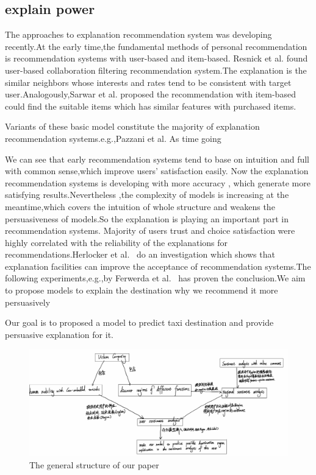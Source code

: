 \documentclass[runningheads]{llncs}
\begin{document}
\subsection{explain power}
The approaches to explanation recommendation system was developing recently.At the early time,the fundamental methods of personal recommendation is recommendation systems with user-based and item-based. Resnick et al.\cite{Resnick1994UserBased} found user-based collaboration filtering recommendation system.The explanation is the similar neighbors whose interests and rates tend to be consistent with target user.Analogously,Sarwar et al. \cite{Sarwar2001ItemBased} proposed the recommendation with item-based could find the suitable items which has similar features with purchased items.

Variants of these basic model constitute the majority of explanation recommendation systems.e.g.,Pazzani et al.\cite{Pazzani2007ContentBased}
As time going



We can see that early recommendation systems tend to base on intuition and full with common sense,which improve users' satisfaction easily. Now the explanation recommendation systems is developing with more accuracy , which generate more satisfying results.Nevertheless ,the complexity of models is increasing at the meantime,which covers the intuition of whole structure and weakens the persuasiveness of models.So the explanation is playing an important part in recommendation systems.%
Majority of users trust and choice satisfaction were highly correlated with the reliability of the explanations for recommendations.Herlocker et al.~\cite{Herlocker2000Explanation}  do an investigation which shows that explanation facilities can improve the acceptance of recommendation systems.The following experiments,e.g.,by Ferwerda et al.~\cite{Ferwerda2012ContentCorrelate} has proven the conclusion.We aim to propose models to explain the destination why we recommend it more persuasively


Our goal is to proposed a model to predict taxi destination and provide persuasive explanation for it.

\begin{figure}
    \centering
    \includegraphics[scale=0.25]{Structure.png}
    \caption{The general structure of our paper}
\end{figure}
\end{document}
